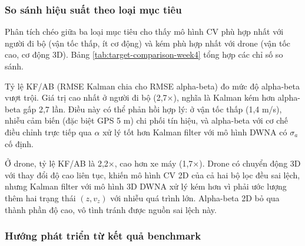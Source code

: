 \subsubsection{So sánh hiệu suất theo loại mục tiêu}

\hspace{0.5cm} Phân tích chéo giữa ba loại mục tiêu cho thấy mô hình CV phù hợp nhất với người đi bộ (vận tốc thấp, ít cơ động) và kém phù hợp nhất với drone (vận tốc cao, cơ động 3D). Bảng \ref{tab:target-comparison-week4} tổng hợp các chỉ số so sánh.

\begin{table}[H]
\centering
\caption{So sánh hiệu suất theo loại mục tiêu}
\label{tab:target-comparison-week4}
\end{table}

Tỷ lệ KF/AB (RMSE Kalman chia cho RMSE alpha-beta) đo mức độ alpha-beta vượt trội. Giá trị cao nhất ở người đi bộ (2,7×), nghĩa là Kalman kém hơn alpha-beta gấp 2,7 lần. Điều này có thể phản hồi hợp lý: ở vận tốc thấp (1,4 m/s), nhiễu cảm biến (đặc biệt GPS 5 m) chi phối tín hiệu, và alpha-beta với cơ chế điều chỉnh trực tiếp qua $\alpha$ xử lý tốt hơn Kalman filter với mô hình DWNA có $\sigma_a$ cố định.

Ở drone, tỷ lệ KF/AB là 2,2×, cao hơn xe máy (1,7×). Drone có chuyển động 3D với thay đổi độ cao liên tục, khiến mô hình CV 2D của cả hai bộ lọc đều sai lệch, nhưng Kalman filter với mô hình 3D DWNA xử lý kém hơn vì phải ước lượng thêm hai trạng thái $(z, v_z)$ với nhiễu quá trình lớn. Alpha-beta 2D bỏ qua thành phần độ cao, vô tình tránh được nguồn sai lệch này.

\subsubsection{Hướng phát triển từ kết quả benchmark}

